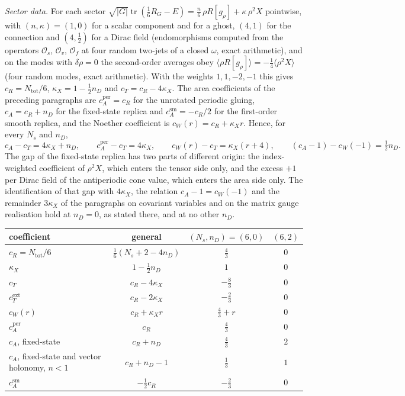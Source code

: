 \emph{Sector data.} For each sector \(\sqrt{|G|}\operatorname{tr}(\tfrac16R_G-E)=\tfrac n6\,\rho R[g_\rho]+\kappa\,\rho^2X\) pointwise, with \((n,\kappa)=(1,0)\) for a scalar component and for a ghost, \((4,1)\) for the connection and \((4,\tfrac12)\) for a Dirac field (endomorphisms computed from the operators \(\mathcal O_s\), \(\mathcal O_v\), \(\mathcal O_f\) at four random two-jets of a closed \(\omega\), exact arithmetic), and on the modes with \(\delta\rho=0\) the second-order averages obey \(\langle\rho R[g_\rho]\rangle=-\tfrac14\langle\rho^2X\rangle\) (four random modes, exact arithmetic). With the weights \(1,1,-2,-1\) this gives \(c_R=N_{\mathrm{tot}}/6\), \(\kappa_X=1-\tfrac12n_D\) and \(c_T=c_R-4\kappa_X\). The area coefficients of the preceding paragraphs are \(c_A^{\mathrm{per}}=c_R\) for the unrotated periodic gluing, \(c_A=c_R+n_D\) for the fixed-state replica and \(c_A^{\mathrm{sm}}=-c_R/2\) for the first-order smooth replica, and the Noether coefficient is \(c_W(r)=c_R+\kappa_Xr\). Hence, for every \(N_s\) and \(n_D\),
\[
  c_A-c_T=4\kappa_X+n_D,\qquad c_A^{\mathrm{per}}-c_T=4\kappa_X,\qquad c_W(r)-c_T=\kappa_X(r+4),\qquad (c_A-1)-c_W(-1)=\tfrac12n_D .
\]
The gap of the fixed-state replica has two parts of different origin: the index-weighted coefficient of \(\rho^2X\), which enters the tensor side only, and the excess \(+1\) per Dirac field of the antiperiodic cone value, which enters the area side only. The identification of that gap with \(4\kappa_X\), the relation \(c_A-1=c_W(-1)\) and the remainder \(3\kappa_X\) of the paragraphs on covariant variables and on the matrix gauge realisation hold at \(n_D=0\), as stated there, and at no other \(n_D\).
\begin{center}
\begin{tabular}{@{}lccc@{}}
\toprule
coefficient & general & \((N_s,n_D)=(6,0)\) & \((6,2)\)\\
\midrule
\(c_R=N_{\mathrm{tot}}/6\) & \(\tfrac16(N_s+2-4n_D)\) & \(\tfrac43\) & \(0\)\\
\(\kappa_X\) & \(1-\tfrac12n_D\) & \(1\) & \(0\)\\
\(c_T\) & \(c_R-4\kappa_X\) & \(-\tfrac83\) & \(0\)\\
\(c_T^{\mathrm{ext}}\) & \(c_R-2\kappa_X\) & \(-\tfrac23\) & \(0\)\\
\(c_W(r)\) & \(c_R+\kappa_Xr\) & \(\tfrac43+r\) & \(0\)\\
\(c_A^{\mathrm{per}}\) & \(c_R\) & \(\tfrac43\) & \(0\)\\
\(c_A\), fixed-state & \(c_R+n_D\) & \(\tfrac43\) & \(2\)\\
\(c_A\), fixed-state and vector holonomy, \(n<1\) & \(c_R+n_D-1\) & \(\tfrac13\) & \(1\)\\
\(c_A^{\mathrm{sm}}\) & \(-\tfrac12c_R\) & \(-\tfrac23\) & \(0\)\\
\bottomrule
\end{tabular}
\end{center}

